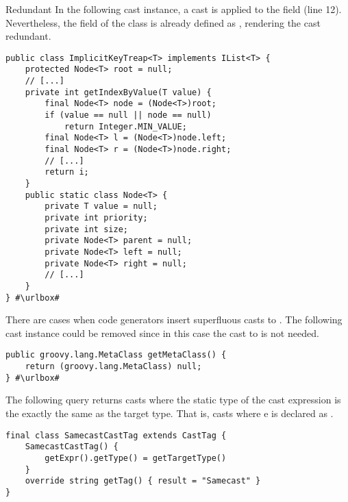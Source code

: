 \begin{pattern}{Redundant}
In the following cast instance,
a cast is applied to the  field (line 12).
Nevertheless, the  field of the  class is already defined as ,
rendering the cast redundant.

\def\urlvar{http://bit.ly/phishman3579_java_algorithms_implementation_2SGcH6w}
\begin{verbatim}
public class ImplicitKeyTreap<T> implements IList<T> {
    protected Node<T> root = null; 
    // [...] 
    private int getIndexByValue(T value) {
        final Node<T> node = (Node<T>)root;
        if (value == null || node == null)
            return Integer.MIN_VALUE;
        final Node<T> l = (Node<T>)node.left;
        final Node<T> r = (Node<T>)node.right;
        // [...]
        return i;
    }
    public static class Node<T> {
        private T value = null;
        private int priority;
        private int size;
        private Node<T> parent = null;
        private Node<T> left = null;
        private Node<T> right = null;
        // [...]
    }
} #\urlbox#
\end{verbatim}

There are cases when code generators insert superfluous casts to .
The following cast instance could be removed since in this case the cast to  is not needed.

\def\urlvar{http://bit.ly/togglz_togglz_2SGncXB}
\begin{verbatim}
public groovy.lang.MetaClass getMetaClass() {
    return (groovy.lang.MetaClass) null;
} #\urlbox#
\end{verbatim}


\detection{}
The following query returns casts where the static type of the cast expression is the exactly the same as the target type.
That is, casts  where e is declared as .

\begin{listing}
\begin{verbatim}
final class SamecastCastTag extends CastTag {
    SamecastCastTag() {
        getExpr().getType() = getTargetType()
    }
    override string getTag() { result = "Samecast" }
}


\end{verbatim}
\end{listing}
\end{pattern}
